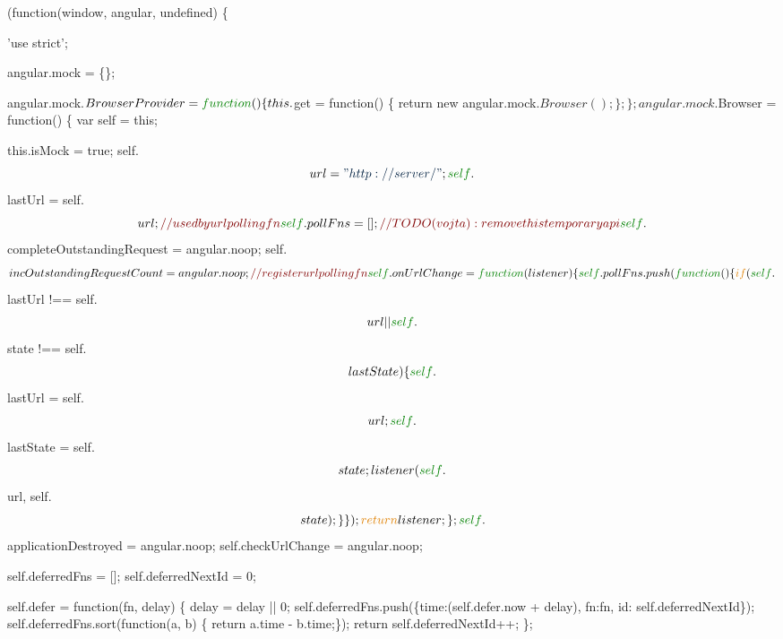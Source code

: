 \begin{DoxyCodeInclude}

(\textcolor{keyword}{function}(window, angular, undefined) \{

\textcolor{stringliteral}{'use strict'};

angular.mock = \{\};

angular.mock.$BrowserProvider = \textcolor{keyword}{function}() \{
  this.$get = \textcolor{keyword}{function}() \{
    \textcolor{keywordflow}{return} \textcolor{keyword}{new} angular.mock.$Browser();
  \};
\};

angular.mock.$Browser = \textcolor{keyword}{function}() \{
  var \textcolor{keyword}{self} = \textcolor{keyword}{this};

  this.isMock = \textcolor{keyword}{true};
  \textcolor{keyword}{self}.$$url = \textcolor{stringliteral}{"http://server/"};
  \textcolor{keyword}{self}.$$lastUrl = \textcolor{keyword}{self}.$$url; \textcolor{comment}{// used by url polling fn}
  \textcolor{keyword}{self}.pollFns = [];

  \textcolor{comment}{// TODO(vojta): remove this temporary api}
  \textcolor{keyword}{self}.$$completeOutstandingRequest = angular.noop;
  \textcolor{keyword}{self}.$$incOutstandingRequestCount = angular.noop;


  \textcolor{comment}{// register url polling fn}

  \textcolor{keyword}{self}.onUrlChange = \textcolor{keyword}{function}(listener) \{
    \textcolor{keyword}{self}.pollFns.push(
      \textcolor{keyword}{function}() \{
        \textcolor{keywordflow}{if} (\textcolor{keyword}{self}.$$lastUrl !== \textcolor{keyword}{self}.$$url || \textcolor{keyword}{self}.$$state !== \textcolor{keyword}{self}.$$lastState) \{
          \textcolor{keyword}{self}.$$lastUrl = \textcolor{keyword}{self}.$$url;
          \textcolor{keyword}{self}.$$lastState = \textcolor{keyword}{self}.$$state;
          listener(\textcolor{keyword}{self}.$$url, \textcolor{keyword}{self}.$$state);
        \}
      \}
    );

    \textcolor{keywordflow}{return} listener;
  \};

  \textcolor{keyword}{self}.$$applicationDestroyed = angular.noop;
  \textcolor{keyword}{self}.$$checkUrlChange = angular.noop;

  \textcolor{keyword}{self}.deferredFns = [];
  \textcolor{keyword}{self}.deferredNextId = 0;

  \textcolor{keyword}{self}.defer = \textcolor{keyword}{function}(fn, delay) \{
    delay = delay || 0;
    \textcolor{keyword}{self}.deferredFns.push(\{time:(\textcolor{keyword}{self}.defer.now + delay), fn:fn, \textcolor{keywordtype}{id}: \textcolor{keyword}{self}.deferredNextId\});
    \textcolor{keyword}{self}.deferredFns.sort(\textcolor{keyword}{function}(a, b) \{ \textcolor{keywordflow}{return} a.time - b.time;\});
    \textcolor{keywordflow}{return} \textcolor{keyword}{self}.deferredNextId++;
  \};



\end{DoxyCodeInclude}
